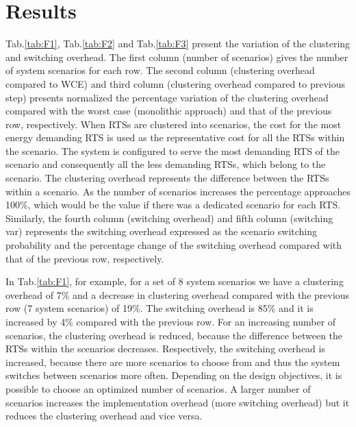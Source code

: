\section{Results}

	Tab.\ref{tab:F1}, Tab.\ref{tab:F2} and Tab.\ref{tab:F3} present the variation of the clustering and switching overhead. The first column (number of scenarios) gives the number of system scenarios for each row. The second column (clustering overhead compared to WCE) and third column (clustering overhead compared to previous step) presents normalized the percentage variation of the clustering overhead compared with the worst case (monolithic approach) and that of the previous row, respectively. When RTSs are clustered into scenarios, the cost for the most energy demanding RTS is used as the representative cost for all the RTSs within the scenario. The system is configured to serve the most demanding RTS of the scenario and consequently all the less demanding RTSs, which belong to the scenario. The clustering overhead represents the difference between the RTSs within a scenario. As the number of scenarios increases the percentage approaches 100\%, which would be the value if there was a dedicated scenario for each RTS. Similarly, the fourth column (switching overhead) and fifth column (switching var) represents the switching overhead expressed as the scenario switching probability and the percentage change of the switching overhead compared with that of the previous row, respectively.
	
	In Tab.\ref{tab:F1}, for example, for a set of 8 system scenarios we have a clustering overhead of 7\% and a decrease in clustering overhead compared with the previous row (7 system scenarios) of 19\%. The switching overhead is 85\% and it is increased by 4\% compared with the previous row. For an increasing number of scenarios, the clustering overhead is reduced, because the difference between the RTSs within the scenarios decreases. Respectively, the switching overhead is increased, because there are more scenarios to choose from and thus the system switches between scenarios more often. Depending on the design objectives, it is possible to choose an optimized number of scenarios. A larger number of scenarios increases the implementation overhead (more switching overhead) but it reduces the clustering overhead and vice versa.
	
